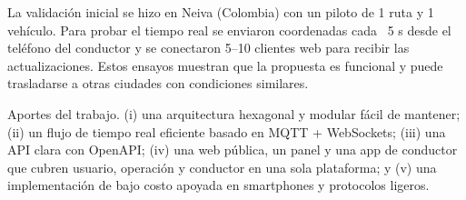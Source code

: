 La validación inicial se hizo en Neiva (Colombia) con un piloto de 1 ruta y 1 vehículo. Para probar el tiempo real se enviaron coordenadas cada ~5 s desde el teléfono del conductor y se conectaron 5–10 clientes web para recibir las actualizaciones. Estos ensayos muestran que la propuesta es funcional y puede trasladarse a otras ciudades con condiciones similares.

Aportes del trabajo. (i) una arquitectura hexagonal y modular fácil de mantener; (ii) un flujo de tiempo real eficiente basado en MQTT + WebSockets; (iii) una API clara con OpenAPI; (iv) una web pública, un panel y una app de conductor que cubren usuario, operación y conductor en una sola plataforma; y (v) una implementación de bajo costo apoyada en smartphones y protocolos ligeros.